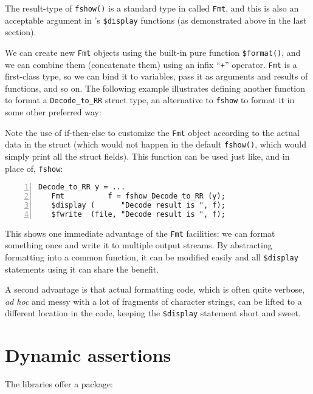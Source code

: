 The result-type of \verb|fshow()| is a standard type in {\BSV} called
\verb|Fmt|, and this is also an acceptable argument in {\BSV}'s
\verb|$display| functions (as demonstrated above in the last section).

We can create new \verb|Fmt| objects using the built-in pure function
\verb|$format()|, and we can combine them (concatenate them) using an
infix ``\verb|+|'' operator.  \verb|Fmt| is a first-class type, so we
can bind it to variables, pass it as arguments and results of
functions, and so on.  The following example illustrates defining
another function to format a \verb|Decode_to_RR| struct type, an
alternative to \verb|fshow| to format it in some other preferred way:


Note the use of if-then-else to customize the \verb|Fmt| object
according to the actual data in the struct (which would not happen in
the default \verb|fshow()|, which would simply print all the struct
fields).  This function can be used just like, and in place of,
\verb|fshow|:

{\footnotesize
\begin{Verbatim}[frame=single, numbers=left]
   Decode_to_RR y = ...
   Fmt          f = fshow_Decode_to_RR (y);
   $display (      "Decode result is ", f);
   $fwrite  (file, "Decode result is ", f);
\end{Verbatim}
}

This shows one immediate advantage of the \verb|Fmt| facilities: we
can format something once and write it to multiple output streams.  By
abstracting formatting into a common function, it can be modified
easily and all \verb|$display| statements using it can share the
benefit.

A second advantage is that actual formatting code, which is often
quite verbose, \emph{ad hoc} and messy with a lot of fragments of
character strings, can be lifted to a different location in the code,
keeping the \verb|$display| statement short and sweet.


\section{Dynamic assertions}


The {\BSV} libraries offer a package:

